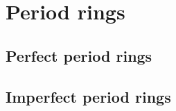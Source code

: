 \section{Period rings}
    \subsection{Perfect period rings}
    
    \subsection{Imperfect period rings}
